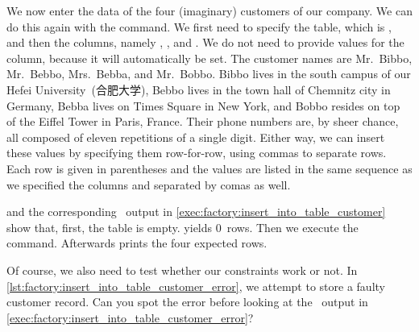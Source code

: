 %
%
\label{sec:factory:table:customer:insert}%
%
%
%
%
%
%
%
We now enter the data of the four (imaginary) customers of our company.
We can do this again with the  command.
We first need to specify the table, which is , and then the columns, namely , , and .
We do not need to provide values for the  column, because it will automatically be set.
The customer names are Mr.~Bibbo, Mr.~Bebbo, Mrs.~Bebba, and Mr.~Bobbo.
Bibbo lives in the south campus of our Hefei University~(合肥大学), Bebbo lives in the town hall of Chemnitz city in Germany, Bebba lives on Times Square in New York, and Bobbo resides on top of the Eiffel Tower in Paris, France.
Their phone numbers are, by sheer chance, all composed of eleven repetitions of a single digit.
Either way, we can insert these values by specifying them row-for-row, using commas to separate rows.
Each row is given in parentheses and the values are listed in the same sequence as we specified the columns and separated by comas as well.

 and the corresponding \psql\ output in \cref{exec:factory:insert_into_table_customer} show that, first, the table is empty.
 yields 0~rows.
Then we execute the  command.
Afterwards  prints the four expected rows.

Of course, we also need to test whether our constraints work or not.
In \cref{lst:factory:insert_into_table_customer_error}, we attempt to store a faulty customer record.
Can you spot the error before looking at the \psql\ output in \cref{exec:factory:insert_into_table_customer_error}?%
\FloatBarrier%
\endhsection%
%
